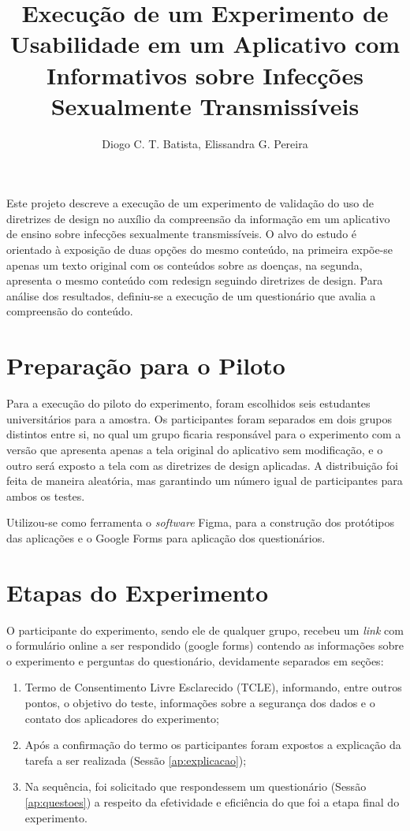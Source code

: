 \documentclass[12pt]{article}
\title{Execução de um Experimento de Usabilidade em um Aplicativo com Informativos sobre Infecções Sexualmente Transmissíveis}
\author{Diogo C. T. Batista\inst{1}, Elissandra G. Pereira\inst{1}}
\begin{document}
\maketitle

\begin{resumo}
	Este projeto descreve a execução de um experimento de validação do uso de diretrizes de design no auxílio da compreensão da informação em um aplicativo de ensino sobre infecções sexualmente transmissíveis. O alvo do estudo é orientado à exposição de duas opções do mesmo conteúdo, na primeira expõe-se apenas um texto original com os conteúdos sobre as doenças, na segunda, apresenta o mesmo conteúdo com redesign seguindo diretrizes de design. Para análise dos resultados, definiu-se a execução de um questionário que avalia a compreensão do conteúdo.
\end{resumo}

\section{Preparação para o Piloto}

Para a execução do piloto do experimento, foram escolhidos seis estudantes universitários para a amostra. Os participantes foram separados em dois grupos distintos entre si, no qual um grupo ficaria responsável para o experimento com a versão que apresenta apenas a tela original do aplicativo sem modificação, e o outro será exposto a tela com as diretrizes de design aplicadas. A distribuição foi feita de maneira aleatória, mas garantindo um número igual de participantes para ambos os testes.

Utilizou-se como ferramenta o \textit{software} Figma, para a construção dos protótipos das aplicações e o Google Forms para aplicação dos questionários.

\section{Etapas do Experimento}
\label{experimento}

O participante do experimento, sendo ele de qualquer grupo, recebeu um \textit{link} com o formulário online a ser respondido (google forms) contendo as informações sobre o experimento e perguntas do questionário, devidamente separados em seções:

\begin{enumerate}
\item Termo de Consentimento Livre Esclarecido (TCLE), informando, entre outros pontos, o objetivo do teste, informações sobre a segurança dos dados e o contato dos aplicadores do experimento;
\item Após a confirmação do termo os participantes foram expostos a explicação da tarefa a ser realizada (Sessão \ref{ap:explicacao});
\item Na sequência, foi solicitado que respondessem um questionário (Sessão \ref{ap:questoes}) a respeito da efetividade e eficiência do que foi a etapa final do experimento.
\end{enumerate}
\end{document}
